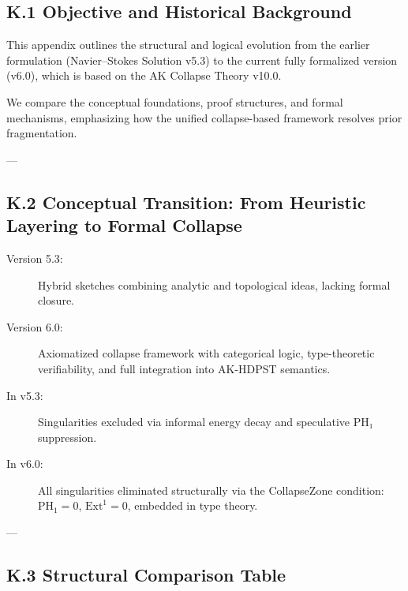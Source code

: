 \documentclass[11pt]{article}
\begin{document}
\subsection*{K.1 Objective and Historical Background}

This appendix outlines the structural and logical evolution from the earlier formulation  
(Navier–Stokes Solution v5.3) to the current fully formalized version (v6.0),  
which is based on the AK Collapse Theory v10.0.

We compare the conceptual foundations, proof structures, and formal mechanisms,  
emphasizing how the unified collapse-based framework resolves prior fragmentation.

---

\subsection*{K.2 Conceptual Transition: From Heuristic Layering to Formal Collapse}

\begin{description}
  \item[Version 5.3:]  
  Hybrid sketches combining analytic and topological ideas, lacking formal closure.

  \item[Version 6.0:]  
  Axiomatized collapse framework with categorical logic, type-theoretic verifiability,  
  and full integration into AK-HDPST semantics.

  \item[In v5.3:]  
  Singularities excluded via informal energy decay and speculative PH₁ suppression.

  \item[In v6.0:]  
  All singularities eliminated structurally via the CollapseZone condition:  
  \( \mathrm{PH}_1 = 0 \), \( \mathrm{Ext}^1 = 0 \), embedded in type theory.
\end{description}

---

\subsection*{K.3 Structural Comparison Table}
\end{document}
